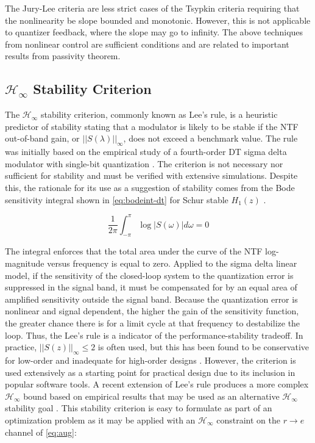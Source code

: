  The Jury-Lee criteria are less strict cases of the Tsypkin criteria requiring that the nonlinearity be slope bounded and monotonic. However, this is not applicable to quantizer feedback, where the slope may go to infinity. The above techniques from nonlinear control are sufficient conditions and are related to important results from passivity theorem.
 
 \subsection{$\mathcal{H}_\infty$ Stability Criterion}
 \label{sec:stab-hinf}
 
The $\mathcal{H}_\infty$ stability criterion, commonly known as Lee's rule, is a heuristic predictor of stability stating that a modulator is likely to be stable if the \gls{NTF} out-of-band gain, or $||S(\lambda)||_\infty$, does not exceed a benchmark value. The rule was initially based on the empirical study of a fourth-order \gls{DT} sigma delta modulator with single-bit quantization \cite{Chao1990}. The criterion is not necessary nor sufficient for stability and must be verified with extensive simulations. Despite this, the rationale for its use as a suggestion of stability comes from the Bode sensitivity integral shown in \autoref{eq:bodeint-dt} for Schur stable $H_1(z)$ \cite[Thm. 1]{Zhao2015}.

\begin{equation} 
	\frac{1}{2\pi}\int_{-\pi}^{\pi} \log \left|S(\omega)\right|d\omega = 0 \label{eq:bodeint-dt}
\end{equation}

The integral enforces that the total area under the curve of the \gls{NTF} log-magnitude versus frequency is equal to zero. Applied to the sigma delta linear model, if the sensitivity of the closed-loop system to the quantization error is suppressed in the signal band, it must be compensated for by an equal area of amplified sensitivity outside the signal band. Because the quantization error is nonlinear and signal dependent, the higher the gain of the sensitivity function, the greater chance there is for a limit cycle at that frequency to destabilize the loop. Thus, the Lee's rule is a indicator of the performance-stability tradeoff. In practice, $||S(z)||_\infty \leq 2$ is often used, but this has been found to be conservative for low-order and inadequate for high-order designs \cite{Schreier1993}. However, the criterion is used extensively as a starting point for practical design due to its inclusion in popular software tools. A recent extension of Lee's rule produces a more complex $\mathcal{H}_\infty$ bound based on empirical results that may be used as an alternative $\mathcal{H}_\infty$ stability goal \cite{Neitola2017}. This stability criterion is easy to formulate as part of an optimization problem as it may be applied with an $\mathcal{H}_\infty$ constraint on the $r \rightarrow e$ channel of \autoref{eq:aug}:

